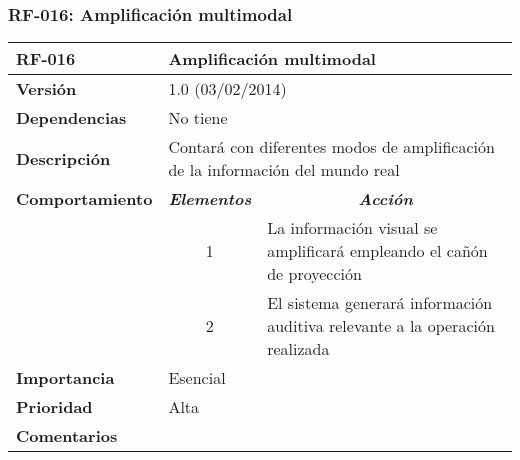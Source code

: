 \subsubsection*{RF-016: Amplificación multimodal}
\begin{tabular}{|l|l|p{8.5cm}|}
\hline
\textbf{RF-016}         & \multicolumn{2}{l|}{\textbf{Amplificación multimodal}}                                                                          \\ \hline
\textbf{Versión}        & \multicolumn{2}{l|}{1.0 (03/02/2014)}                                                                                           \\ \hline
\textbf{Dependencias}   & \multicolumn{2}{l|}{No tiene}                                                                                                   \\ \hline
\textbf{Descripción}    & \multicolumn{2}{p{11.5cm}|}{Contará con diferentes modos de amplificación de la información del mundo real}                     \\ \hline
\textbf{Comportamiento} & \multicolumn{1}{c|}{\textit{\textbf{Elementos}}} & \multicolumn{1}{c|}{\textit{\textbf{Acción}}}                                \\ \hline
                        & \multicolumn{1}{c|}{1}                       & La información visual se amplificará empleando el cañón de proyección            \\ \cline{2-3} 
                        & \multicolumn{1}{c|}{2}                       & El sistema generará información auditiva relevante a la operación realizada      \\ \cline{2-3} 
\textbf{Importancia}    & \multicolumn{2}{l|}{Esencial}                                                                                                   \\ \hline
\textbf{Prioridad}      & \multicolumn{2}{l|}{Alta}                                                                                                       \\ \hline
\textbf{Comentarios}    & \multicolumn{2}{l|}{}                                                                                                           \\ \hline
\end{tabular}
